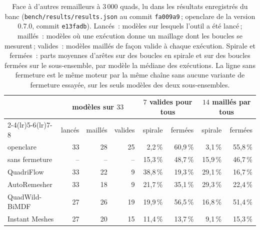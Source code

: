 \documentclass[11pt,a4paper]{article}
\begin{document}
\begin{table}[t]
\centering
\small
\setlength{\tabcolsep}{4pt}
\begin{tabular}{lrrrrrrr}
\toprule
& \multicolumn{3}{c}{modèles sur $33$} & \multicolumn{2}{c}{$7$ valides pour tous}
& \multicolumn{2}{c}{$14$ maillés par tous} \\
\cmidrule(lr){2-4}\cmidrule(lr){5-6}\cmidrule(lr){7-8}
& lancés & maillés & valides & spirale & fermées & spirale & fermées \\
\midrule
openclare & 33 & 28 & 25 & 2,2\,\% & 60,9\,\% & 3,1\,\% & 55,8\,\% \\
\quad sans fermeture & -- & -- & -- & 15,3\,\% & 48,7\,\% & 15,9\,\% & 46,7\,\% \\
QuadriFlow & 33 & 22 & 9 & 38,8\,\% & 19,3\,\% & 29,1\,\% & 16,7\,\% \\
AutoRemesher & 33 & 18 & 9 & 21,7\,\% & 35,1\,\% & 29,3\,\% & 22,4\,\% \\
QuadWild-BiMDF & 27 & 26 & 19 & 19,9\,\% & 56,5\,\% & 16,8\,\% & 51,4\,\% \\
Instant Meshes & 27 & 20 & 15 & 11,4\,\% & 13,7\,\% & 9,1\,\% & 15,3\,\% \\
\bottomrule
\end{tabular}
\caption{Face à d'autres remailleurs à $3\,000$ quads, lu dans les résultats
enregistrés du banc (\nolinkurl{bench/results/results.json} au commit
\texttt{fa009a9}\,; openclare de la version 0.7.0, commit \texttt{e13fadb}).
Lancés~: modèles sur lesquels l'outil a été lancé\,; maillés~: modèles où une
exécution donne un maillage dont les boucles se mesurent\,; valides~: modèles
maillés de façon valide à chaque exécution. Spirale et fermées~: parts
moyennes d'arêtes sur des boucles en spirale et sur des boucles fermées sur
le sous-ensemble, par modèle la médiane des exécutions. La ligne sans
fermeture est le même moteur par la même chaîne sans aucune variante de
fermeture essayée, sur les seuls modèles des deux sous-ensembles.}
\label{tab:remeshers}
\end{table}
\end{document}
